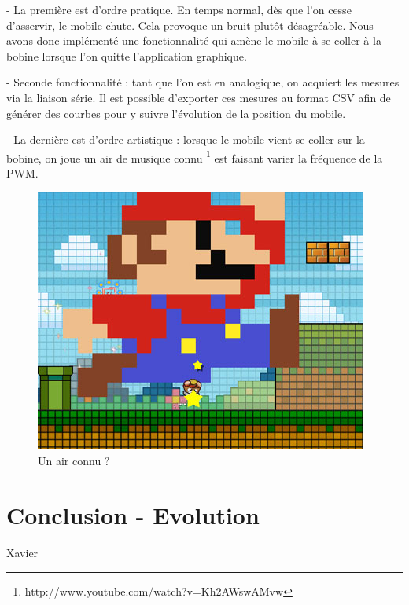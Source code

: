 \documentclass[11pt, french]{article} %
\begin{document}
 \medskip
 
 - La première est d'ordre pratique. En temps normal, dès que l'on cesse d'asservir, le mobile chute. Cela provoque un bruit plutôt désagréable. Nous avons donc implémenté une fonctionnalité qui amène le mobile à se coller à la bobine lorsque l'on quitte l'application graphique. 
 
 - Seconde fonctionnalité : tant que l'on est en analogique, on acquiert les mesures via la liaison série. Il est possible d'exporter ces mesures au format CSV afin de générer des courbes pour y suivre l'évolution de la position du mobile.
 
  - La dernière est d'ordre artistique : lorsque le mobile vient se coller sur la bobine, on joue un air de musique connu \footnote{http://www.youtube.com/watch?v=Kh2AWswAMvw} est faisant varier la fréquence de la PWM. 
  
\begin{figure}[h!]
	\centering
	\includegraphics[width = 4 cm]{SolutionNumerique/mario.png} 
	\caption{Un air connu ?}
\end{figure}
 
 
\section*{Conclusion - Evolution}
Xavier
\end{document}
